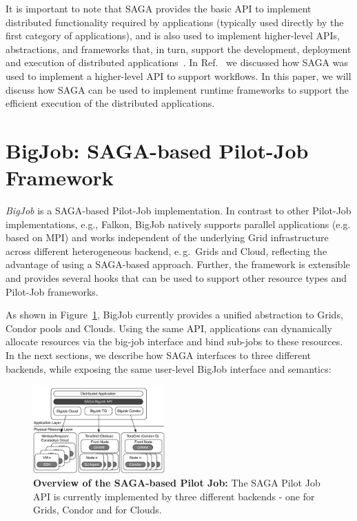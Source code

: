 \documentclass[conference,final]{IEEEtran}
\newcommand{\up}{\vspace*{-1em}}
\newcommand{\alnote}[1]{ {\textcolor{blue} { ***AL: #1 }}}
\newcommand{\jhanote}[1]{ {\textcolor{red} { ***SJ: #1 }}}
\newcommand{\alnote}[1]{}
\newcommand{\jhanote}[1]{}
\begin{document}
It is important to note that SAGA provides the basic API to implement
distributed functionality required by applications (typically used
directly by the first category of applications), and is also used to
implement higher-level APIs, abstractions, and frameworks that, in
turn, support the development, deployment and execution of distributed
applications~\cite{enkf-gmac09}. In Ref.~\cite{sagamontage09} we
discussed how SAGA was used to implement a higher-level API to support
workflows. In this paper, we will discuss how SAGA can be used to
implement runtime frameworks to support the efficient execution of the
distributed applications.

\up
\section{BigJob: SAGA-based Pilot-Job Framework}
\up

\emph{BigJob} is a SAGA-based Pilot-Job implementation. In contrast to
other Pilot-Job implementations, e.g., Falkon, BigJob natively
supports parallel applications (e.g. based on MPI) and works
independent of the underlying Grid infrastructure across different
heterogeneous backend, e.\,g.\ Grids and Cloud, reflecting the
advantage of using a SAGA-based approach. Further, the framework is
extensible and provides several hooks that can be used to support
other resource types and Pilot-Job frameworks.

As shown in Figure~\ref{fig:figures_distributed_pilot_job}, BigJob currently
provides a unified abstraction to Grids, Condor pools and
Clouds. Using the same API, applications can dynamically allocate
resources via the big-job interface and bind sub-jobs to these
resources. In the next sections, we describe how SAGA interfaces to
three different backends, while exposing the same user-level BigJob interface
and semantics:


\begin{figure}[htbp]
    \centering
        \includegraphics[width=0.45\textwidth]{figures/distributed_pilot_job}
        \caption{\textbf{Overview of the SAGA-based Pilot Job:} The
          SAGA Pilot Job API is currently implemented by three
          different backends - one for Grids, Condor and for
          Clouds.}
    \label{fig:figures_distributed_pilot_job}
\end{figure}
\end{document}
